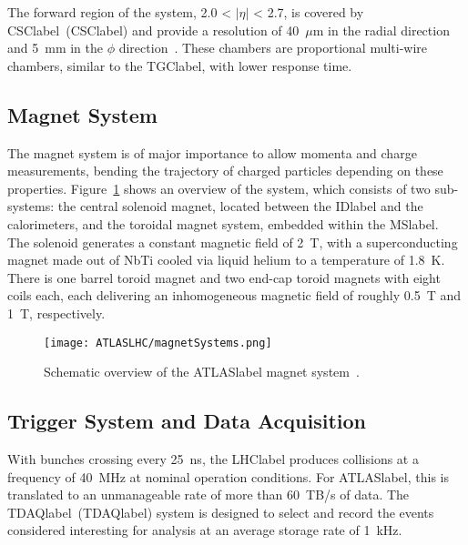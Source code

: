 The forward region of the system, 2.0 < $|\eta|$ < 2.7, is covered by \acrlong{CSClabel}~(\acrshort{CSClabel}) and provide a resolution of 40~$\mu$m in the radial direction and 5~mm in the $\phi$ direction~\cite{Collaboration_2008}. These chambers are proportional multi-wire chambers, similar to the \acrshort{TGClabel}, with lower response time.

\subsection{Magnet System}

The magnet system is of major importance to allow momenta and charge measurements, bending the trajectory of charged particles depending on these properties. Figure~\ref{figLHC:ATLASMagnets} shows an overview of the system, which consists of two sub-systems: the central solenoid magnet, located between the \acrshort{IDlabel} and the calorimeters, and the toroidal magnet system, embedded within the \acrshort{MSlabel}.\\

The solenoid generates a constant magnetic field of 2~T, with a superconducting magnet made out of NbTi cooled via liquid helium to a temperature of 1.8~K. There is one barrel toroid magnet and two end-cap toroid magnets with eight coils each, each delivering an inhomogeneous magnetic field of roughly 0.5~T and 1~T, respectively.

\begin{figure}[htbp]
    \RawFloats
    \begin{center}
    \texttt{[image: ATLASLHC/magnetSystems.png]}
    \caption{
        Schematic overview of the \acrshort{ATLASlabel} magnet system~\cite{JetGoodson}. 
    }
    \label{figLHC:ATLASMagnets}
    \end{center}
\end{figure}

\subsection{Trigger System and Data Acquisition}

With bunches crossing every 25~ns, the \acrshort{LHClabel} produces collisions at a frequency of 40~MHz at nominal operation conditions. For \acrshort{ATLASlabel}, this is translated to an unmanageable rate of more than 60~TB/s of data. The \acrlong{TDAQlabel}~(\acrshort{TDAQlabel}) system is designed to select and record the events considered interesting for analysis at an average storage rate of 1~kHz.\\

